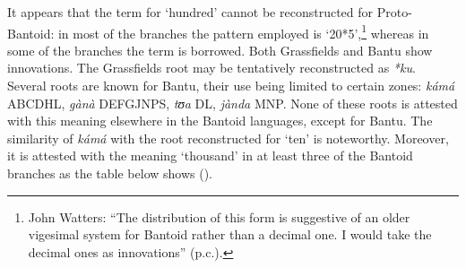 It appears that the term for `hundred' cannot be reconstructed for Proto-Bantoid: in most of the branches the pattern employed is ‘20*5’,\footnote{John Watters: ``The distribution of this form is suggestive of an older vigesimal system for Bantoid rather than a decimal one. I would take the decimal ones as innovations'' (p.c.).} whereas in some of the branches the term is borrowed. Both Grassfields and Bantu show innovations. The Grassfields root may be tentatively reconstructed as \textit{*ku}. Several roots are known for Bantu, their use being limited to certain zones: \textit{kámá} ABCDHL, \textit{gànà} DEFGJNPS, \textit{tʊa} DL, \textit{jànda} MNP. None of these roots is attested with this meaning elsewhere in the Bantoid languages, except for Bantu. The similarity of \textit{kámá} with the root reconstructed for `ten' is noteworthy. Moreover, it is attested with the meaning `thousand' in at least three of the Bantoid branches as the table below shows ().

